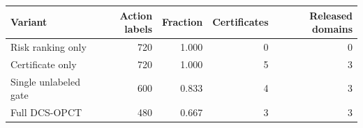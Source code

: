 \begin{tabular}{lrrrr}
\toprule
Variant & Action labels & Fraction & Certificates & Released domains \\
\midrule
Risk ranking only & 720 & 1.000 & 0 & 0 \\
Certificate only & 720 & 1.000 & 5 & 3 \\
Single unlabeled gate & 600 & 0.833 & 4 & 3 \\
Full DCS-OPCT & 480 & 0.667 & 3 & 3 \\
\bottomrule
\end{tabular}
